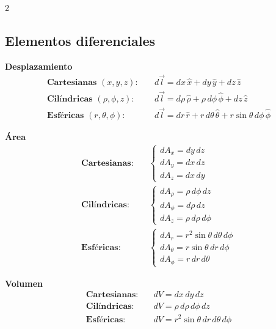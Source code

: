               \newpage
\begin{multicols}{2}
\subsection{Elementos diferenciales}
\begin{itemform}
  \item \textbf{Desplazamiento}
    \begin{align*}
        \textbf{Cartesianas } (x,y,z):&\quad d\vec{l} = dx\,\hat{x} + dy\,\hat{y} + dz\,\hat{z} \\
        \textbf{Cilíndricas } (\rho,\phi,z):&\quad d\vec{l} = d\rho\,\hat{\rho} + \rho\,d\phi\,\hat{\phi} + dz\,\hat{z} \\
        \textbf{Esféricas } (r,\theta,\phi):&\quad d\vec{l} = dr\,\hat{r} + r\,d\theta\,\hat{\theta} + r\sin\theta\,d\phi\,\hat{\phi}
    \end{align*}

  \item \textbf{Área}
    \begin{align*}
        \textbf{Cartesianas}:&\quad 
        \begin{cases}
            dA_x = dy\,dz \\
            dA_y = dx\,dz \\
            dA_z = dx\,dy
        \end{cases} \\
        \textbf{Cilíndricas}:&\quad 
        \begin{cases}
            dA_\rho = \rho\,d\phi\,dz \\
            dA_\phi = d\rho\,dz \\
            dA_z = \rho\,d\rho\,d\phi
        \end{cases} \\
        \textbf{Esféricas}:&\quad 
        \begin{cases}
            dA_r = r^2\sin\theta\,d\theta\,d\phi \\
            dA_\theta = r\sin\theta\,dr\,d\phi \\
            dA_\phi = r\,dr\,d\theta
        \end{cases}
    \end{align*}

  \item \textbf{Volumen}
    \begin{align*}
        \textbf{Cartesianas}:&\quad dV = dx\,dy\,dz \\
        \textbf{Cilíndricas}:&\quad dV = \rho\,d\rho\,d\phi\,dz \\
        \textbf{Esféricas}:&\quad dV = r^2\sin\theta\,dr\,d\theta\,d\phi
    \end{align*}
\end{itemform}
 

\end{multicols}
